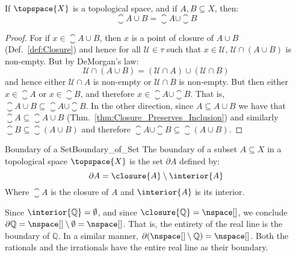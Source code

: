         \begin{theorem}
            \label{thm:Closure_Preserves_Union}%
            If $\topspace{X}$ is a topological space, and if
            $A,B\subseteq{X}$, then:
            \begin{equation}
                \closure{A\cup{B}}=\closure{A}\cup\closure{B}
            \end{equation}
        \end{theorem}
        \begin{proof}
            For if $x\in\closure{A\cup{B}}$, then $x$ is a point of closure
            of $A\cup{B}$ (Def.~\ref{def:Closure}) and hence for all
            $\mathcal{U}\in\tau$ such that $x\in\mathcal{U}$,
            $\mathcal{U}\cap(A\cup{B})$ is non-empty. But by DeMorgan's law:
            \begin{equation}
                \mathcal{U}\cap(A\cup{B})
                    =(\mathcal{U}\cap{A})\cup(\mathcal{U}\cap{B})
            \end{equation}
            and hence either $\mathcal{U}\cap{A}$ is non-empty or
            $\mathcal{U}\cap{B}$ is non-empty. But then either
            $x\in\closure{A}$ or $x\in\closure{B}$, and therefore
            $x\in\closure{A}\cup\closure{B}$. That is,
            $\closure{A\cup{B}}\subseteq\closure{A}\cup\closure{B}$. In the
            other direction, since $A\subseteq{A}\cup{B}$ we have that
            $\closure{A}\subseteq\closure{A\cup{B}}$
            (Thm.~\ref{thm:Closure_Preserves_Inclusion}) and similarly
            $\closure{B}\subseteq\closure(A\cup{B})$ and therefore
            $\closure{A}\cup\closure{B}\subseteq\closure(A\cup{B})$.
        \end{proof}
        \begin{fdefinition}{Boundary of a Set}{Boundary_of_Set}
            The boundary of a subset $A\subseteq{X}$ in a topological space
            $\topspace{X}$ is the set $\partial{A}$ defined by:
            \begin{equation*}
                \partial{A}=\closure{A}\setminus\interior{A}
            \end{equation*}
            Where $\closure{A}$ is the closure of $A$ and $\interior{A}$ is
            its interior.
        \end{fdefinition}
        \begin{example}
            Since $\interior{\mathbb{Q}}=\emptyset$, and since
            $\closure{\mathbb{Q}}=\nspace[]$, we conclude
            $\partial\mathbb{Q}=\nspace[]\setminus\emptyset=\nspace[]$. That
            is, the entirety of the real line is the boundary of
            $\mathbb{Q}$. In a similar manner,
            $\partial(\nspace[]\setminus\mathbb{Q})=\nspace[]$. Both the
            rationals and the irrationals have the entire real line as their
            boundary.
        \end{example}
